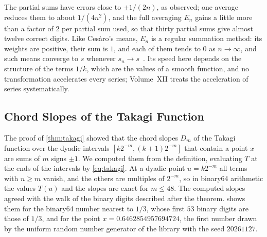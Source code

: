 The partial sums have errors close to $\pm1/(2n)$, as  observed; one average reduces them to about $1/(4n^2)$, and the full averaging $E_n$ gains a little more than a factor of $2$ per partial sum used, so that thirty partial sums give almost twelve correct digits. Like Ces\`aro's means, $E_n$ is a regular summation method: its weights are positive, their sum is $1$, and each of them tends to $0$ as $n\to\infty$, and such means converge to $s$ whenever $s_n\to s$~\cite{knopp1990}. Its speed here depends on the structure of the terms $1/k$, which are the values of a smooth function, and no transformation accelerates every series; Volume~XII treats the acceleration of series systematically.

\subsection{Chord Slopes of the Takagi Function}

The proof of \cref{thm:takagi} showed that the chord slopes $D_m$ of the Takagi function over the dyadic intervals $[k2^{-m},(k+1)2^{-m}]$ that contain a point $x$ are sums of $m$ signs $\pm1$. We computed them from the definition, evaluating $T$ at the ends of the intervals by \eqref{eq:takagi}. At a dyadic point $u=k2^{-m}$ all terms with $n\ge m$ vanish, and the others are multiples of $2^{-m}$, so in binary64 arithmetic the values $T(u)$ and the slopes are exact for $m\le48$. The computed slopes agreed with the walk of the binary digits described after the theorem.  shows them for the binary64 number nearest to $1/3$, whose first $53$ binary digits are those of $1/3$, and for the point $x=0.6462854957694724$, the first number drawn by the uniform random number generator of the library with the seed $20261127$.

